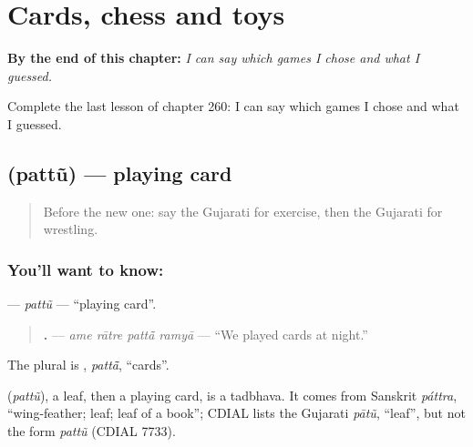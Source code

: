 
\chapter{Cards, chess and toys}
\label{ch:gu-cards-chess-and-toys}

\begin{chapteropening}
\textbf{By the end of this chapter:} \emph{I can say which games I chose and what I guessed.}

Complete the last lesson of chapter 260: I can say which games I chose and what I guessed.
\end{chapteropening}

\section[\texorpdfstring{\gu{પત્તું} (pattũ)}{પત્તું (pattũ)}]{ (pattũ) — playing card}

\label{lesson:GU-C260-pattu}



\begin{quote}
Before the new one: say the Gujarati for exercise, then the Gujarati for wrestling.
\end{quote}

\subsection*{You'll want to know: }
\textbf{} — \emph{pattũ} — \textquotedblleft{}playing card\textquotedblright{}.

\begin{quote}
\textbf{   .} — \emph{ame rātre pattā̃ ramyā} — \textquotedblleft{}We played cards at night.\textquotedblright{}
\end{quote}

The plural is \textbf{}, \emph{pattā̃}, \textquotedblleft{}cards\textquotedblright{}.

\begin{cousinweb}
\textbf{} (\emph{pattũ}), a leaf, then a playing card, is a tadbhava. It comes from Sanskrit \emph{páttra}, \textquotedblleft{}wing-feather; leaf; leaf of a book\textquotedblright{}; CDIAL lists the Gujarati \emph{pātũ}, \textquotedblleft{}leaf\textquotedblright{}, but not the form \emph{pattũ} (CDIAL 7733).
\end{cousinweb}

